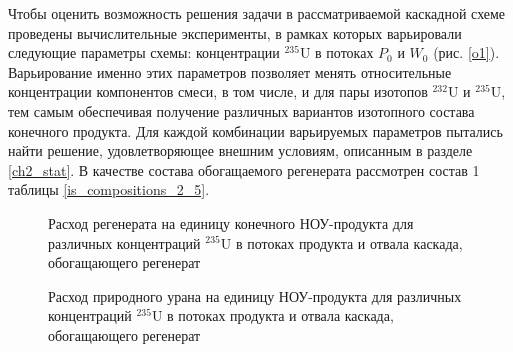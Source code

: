 Чтобы оценить возможность решения задачи в рассматриваемой каскадной схеме проведены вычислительные эксперименты, в рамках которых варьировали следующие параметры схемы: концентрации $^{235}$U в потоках $P_0$ и $W_0$ (рис. \ref{o1}). Варьирование именно этих параметров позволяет менять относительные концентрации компонентов смеси, в том числе, и для пары изотопов $^{232}$U и $^{235}$U, тем самым обеспечивая получение различных вариантов изотопного состава конечного продукта. Для каждой комбинации варьируемых параметров пытались найти решение, удовлетворяющее внешним условиям, описанным в разделе \ref{ch2_stat}. В качестве состава обогащаемого регенерата рассмотрен состав 1 таблицы \ref{is_compositions_2_5}.  

\begin{figure}[ht]
  \caption{Расход регенерата на единицу конечного НОУ-продукта для различных концентраций $^{235}$U в потоках продукта и отвала каскада, обогащающего регенерат}\label{Figure_10}
\end{figure}

\begin{figure}[ht]
  \caption{Расход природного урана на единицу НОУ-продукта  для различных концентраций $^{235}$U в потоках продукта и отвала каскада, обогащающего регенерат}\label{fig:sc2_2}
\end{figure}

